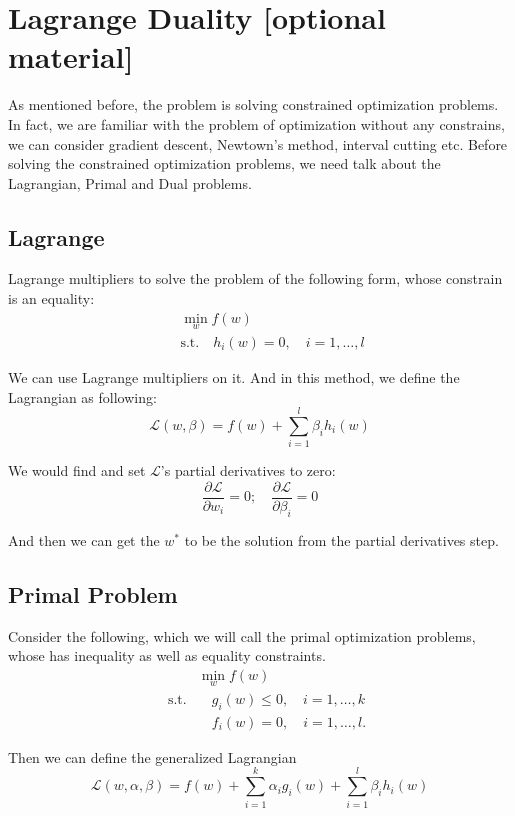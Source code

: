 \documentclass[a4paper]{article}
\begin{document}
\section{Lagrange Duality [optional material]}

As mentioned before, the problem is solving constrained optimization problems. In fact, we are familiar with the problem of optimization without any constrains, we can consider gradient descent, Newtown's method, interval cutting etc. Before solving the constrained optimization problems, we need talk about the Lagrangian, Primal and Dual problems.

\subsection{Lagrange}
Lagrange multipliers to solve the problem of the following form, whose constrain is an equality:
\begin{align*}
&\quad \min_{w} f(w) \\
&\quad \text{s.t.} \quad  h_{i}(w) = 0, \quad i = 1, \dots,l
\end{align*}

We can use Lagrange multipliers on it. And in this method, we define the Lagrangian as following:
$$
	\mathcal{L} (w, \beta) = f(w) + \sum_{i=1}^{l} \beta_i h_i(w)
$$

We would find and set $\mathcal{L}$'s partial derivatives to zero:
$$
	\frac{\partial \mathcal{L}}{\partial w_i} = 0; \quad \frac{\partial \mathcal{L}}{\partial \beta_i} = 0
$$

And then we can get the $w^\ast$ to be the solution from the partial derivatives step.

\subsection{Primal Problem}
Consider the following, which we will call the primal optimization problems, whose has inequality as well as equality constraints. 
\begin{align*}
	&\min_w f(w) \\
	\quad  \text{s.t.} &\quad g_i(w) \leq 0, \quad i = 1, \dots, k \\
	\quad &\quad f_i(w) = 0, \quad i = 1, \dots, l.
\end{align*}

Then we can define the generalized Lagrangian
$$
	\mathcal{L}(w, \alpha, \beta) = f(w) + \sum_{i=1}^{k} \alpha_i g_i(w) + \sum_{i=1}^{l} \beta_i h_i(w)
$$
\end{document}
